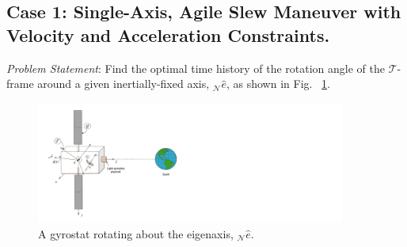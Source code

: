 \documentclass[journal ]{new-aiaa}
\begin{document}
\subsection{Case 1: Single-Axis, Agile Slew Maneuver with Velocity and Acceleration Constraints.}	
	{\it Problem Statement}: Find the optimal time history of the rotation angle of the $\mathcal{T}$- frame around a given inertially-fixed axis, $_\mathcal{N}\hat{e}$, as shown in Fig. ~\ref{s/c}. 
	\begin{figure}[h!]
		\centering
			\includegraphics[width=4in]{Spacecraft_earth2}  
			\caption{A gyrostat rotating about the eigenaxis, $_\mathcal{N}\hat{e}$.}
			\label{s/c}
	\end{figure}
\end{document}
